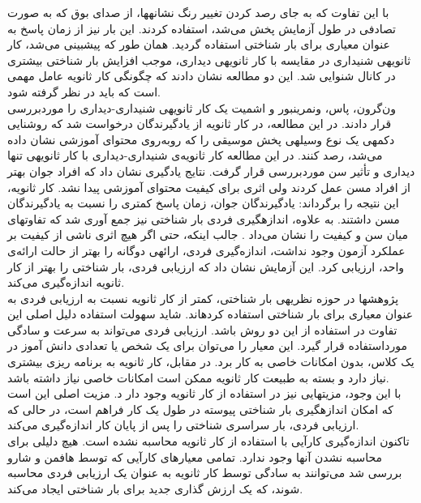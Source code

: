 با این تفاوت كه به جای رصد  كردن تغيير رنگ نشانهها، از صدای بوق كه به صورت تصادفی در طول 
آزمایش پخش  می‌شد، استفاده  كردند.  این بار  نيز از  زمان  پاسخ  به عنوان  معياری برای بار شناختی
استفاده گردید. همان طور كه پيشبينی می‌شد، كار ثانویهی شنيداری در مقایسه با كار ثانویهی دیداری،
موجب افزایش بار شناختی بيشتری در كانال شنوایی شد.
\cite{brunken2002assessment}
این دو مطالعه نشان دادند كه چگونگی
كار ثانویه عامل مهمی است كه باید در نظر گرفته شود.
\\
ون‌گرون، پاس، ونمرینبور و اشميت یک كار ثانویهی شنيداری-دیداری را موردبررسی قرار دادند. در 
این مطالعه، در  كار  ثانویه از  یادگيرندگان درخواست  شد  كه  روشنایی دكمهی یک نوع وسيلهی  پخش 
موسيقی
 را  كه  روبه‌روی محتوای آموزشی نشان داده  می‌شد، رصد  كنند. در این مطالعه  كار ثانویه‌ی
شنيداری-دیداری با كار ثانویهی تنها دیداری و تأثير سن موردبررسی قرار گرفت. نتایج یادگيری نشان داد 
كه افراد جوان بهتر از افراد مسن عمل كردند ولی اثری برای كيفيت محتوای آموزشی پيدا نشد. كار ثانویه،
این نتيجه را برگرداند: یادگيرندگان جوان، زمان پاسخ كمتری را نسبت به یادگيرندگان مسن داشتند. به
علاوه، اندازهگيری فردی بار شناختی نيز جمع آوری شد كه تفاوتهای ميان سن و كيفيت را نشان می‌داد .
جالب اینکه، حتی اگر هيچ اثری ناشی از كيفيت بر عملکرد آزمون وجود نداشت، اندازه‌گيری فردی،
ارائهی دوگانه  را  بهتر از  حالت ارائه‌ی واحد،  ارزیابی كرد.  این آزمایش نشان داد  كه  ارزیابی فردی، بار
شناختی را بهتر از كار ثانویه اندازه‌گيری می‌كند.
\cite{van2006modality}
\\
پژوهشها در حوزه نظریهی بار شناختی، كمتر از كار ثانویه نسبت به ارزیابی فردی به عنوان معياری
برای بار شناختی استفاده كردهاند. شاید سهولت استفاده دليل اصلی این تفاوت در استفاده از این دو 
روش باشد. ارزیابی فردی می‌تواند به سرعت و سادگی مورداستفاده قرار گيرد. این معيار را می‌توان برای
یک شخص یا تعدادی دانش آموز در یک كلاس، بدون امکانات خاصی به كار برد. در مقابل، كار ثانویه به برنامه ریزی بيشتری نياز دارد  و  بسته  به  طبيعت كار  ثانویه ممکن  است امکانات  خاصی نياز داشته 
باشد.
\cite{sweller2011measuring}
\\
با این وجود، مزیتهایی نيز در استفاده  از  كار ثانویه وجود  دار د.  مزیت اصلی این است كه  امکان
اندازهگيری بار شناختی پيوسته در طول یک كار فراهم است، در حالی كه ارزیابی فردی، بار سراسری
شناختی را پس از پایان كار اندازه‌گيری می‌كند.
\cite{sweller2011measuring}
\\
تاكنون اندازه‌گيری كارآیی با استفاده از كار ثانویه محاسبه نشده است. هيچ دليلی برای محاسبه نشدن
آنها وجود ندارد. تمامی معيارهای كارآیی كه توسط هافمن و شارو
\cite{hoffman2010conceptions}
بررسی شد می‌توانند به سادگی
توسط كار ثانویه به عنوان یک ارزیابی فردی محاسبه شوند، كه یک ارزش گذاری جدید برای بار شناختی
ایجاد می‌كند.
